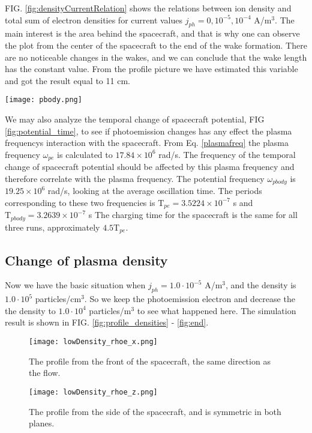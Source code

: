\documentclass[aip, 
rsi, 
amsmath,
amssymb,
longbibliography,
preprint]{revtex4-1}
\begin{document}
FIG. \ref{fig:densityCurrentRelation} shows the relations between ion density and total sum of electron densities for current values $j_{ph}=0, 10^{-5}, 10^{-4}$ A/m$^3$. The main interest is the area behind the spacecraft, and that is why one can observe the plot from the center of the spacecraft to the end of the wake formation. There are no noticeable changes in the wakes, and we can conclude that the wake length has the constant value. From the profile picture we have estimated this variable and got the result equal to 11 cm.

\begin{figure*}
\texttt{[image: pbody.png]}
\caption{The change in the spacecraft potential over time. Data from one simulation with no photoemission, and two simulations with photoemission from the wake side on the body. $j_{ph}$ is the photoemission density in A/m$^3$. \label{fig:potential_time}}
\end{figure*}

We may also analyze the temporal change of spacecraft potential, FIG \ref{fig:potential_time}, to see if photoemission changes has any effect the plasma frequencys interaction with the spacecraft.  From Eq. \ref{plasmafreq} the plasma frequency $\omega_{pe}$ is calculated to $17.84 \times 10^6$ rad/s. The frequency of the temporal change of spacecraft potential should be affected by this plasma frequency and therefore correlate with the plasma frequency. The potential frequency $\omega_{pbody}$ is $19.25 \times 10^6$ rad/s, looking at the average oscillation time. The periods corresponding to these two frequencies is $\mathrm{T}_{pe} = 3.5224 \times 10^{-7}$ s and $\mathrm{T}_{pbody} = 3.2639 \times 10^{-7}$ s The charging time for the spacecraft is the same for all three runs, approximately $4.5\mathrm{T}_{pe}$.

\subsection{Change of plasma density}

Now we have the basic situation when $j_{ph}= 1.0\cdot10^{-5}$ A/m$^3$, and the density is $1.0\cdot10^5$ particles/cm$^3$. So we keep the photoemission electron and decrease the the density to $1.0\cdot10^4$ particles/m$^3$ to see what happened here. The simulation result is shown in FIG. \ref{fig:profile_densities} - \ref{fig:end}.

\begin{figure*}[!ht]
\begin{subfigure}{0.45\textwidth}
\texttt{[image: lowDensity\_rhoe\_x.png]}
\caption{The profile from the front of the spacecraft, the same direction as the flow.}
\end{subfigure}
\begin{subfigure}{0.45\textwidth}
\texttt{[image: lowDensity\_rhoe\_z.png]}
\caption{The profile from the side of the spacecraft, and is symmetric in both planes.}
\end{subfigure}
\caption{The situation when we have lowered the density by an order of 1 and the photoemission is $j_{ph} = 10^{-5}$ A/m$^3$} \label{fig:profile_densities}
\end{figure*}
\end{document}

